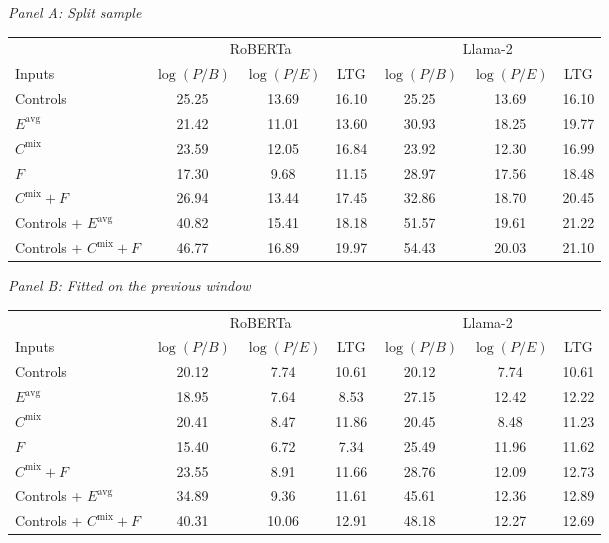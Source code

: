 \begin{table}[htbp]
{\footnotesize
\textit{Panel A: Split sample}\\[2pt]
\begin{adjustbox}{max width=\linewidth, max totalheight=0.28\textheight}
\begin{tabular}{lcccccc}
\toprule
 & \multicolumn{3}{c}{RoBERTa} & \multicolumn{3}{c}{Llama-2} \\
\cmidrule(lr){2-4} \cmidrule(lr){5-7}
Inputs & $\log(P/B)$ & $\log(P/E)$ & LTG & $\log(P/B)$ & $\log(P/E)$ & LTG \\
\midrule
Controls & 25.25 & 13.69 & 16.10 & 25.25 & 13.69 & 16.10 \\
$E^{\mathrm{avg}}$ & 21.42 & 11.01 & 13.60 & 30.93 & 18.25 & 19.77 \\
$C^{\mathrm{mix}}$ & 23.59 & 12.05 & 16.84 & 23.92 & 12.30 & 16.99 \\
$F$ & 17.30 & \phantom{0}9.68 & 11.15 & 28.97 & 17.56 & 18.48 \\
$C^{\mathrm{mix}}+F$ & 26.94 & 13.44 & 17.45 & 32.86 & 18.70 & 20.45 \\
Controls + $E^{\mathrm{avg}}$ & 40.82 & 15.41 & 18.18 & 51.57 & 19.61 & 21.22 \\
Controls + $C^{\mathrm{mix}}+F$ & 46.77 & 16.89 & 19.97 & 54.43 & 20.03 & 21.10 \\
\bottomrule
\end{tabular}
\end{adjustbox}
\par\medskip
\textit{Panel B: Fitted on the previous window}\\[2pt]
\begin{adjustbox}{max width=\linewidth, max totalheight=0.28\textheight}
\begin{tabular}{lcccccc}
\toprule
 & \multicolumn{3}{c}{RoBERTa} & \multicolumn{3}{c}{Llama-2} \\
\cmidrule(lr){2-4} \cmidrule(lr){5-7}
Inputs & $\log(P/B)$ & $\log(P/E)$ & LTG & $\log(P/B)$ & $\log(P/E)$ & LTG \\
\midrule
Controls & 20.12 & \phantom{0}7.74 & 10.61 & 20.12 & \phantom{0}7.74 & 10.61 \\
$E^{\mathrm{avg}}$ & 18.95 & \phantom{0}7.64 & \phantom{0}8.53 & 27.15 & 12.42 & 12.22 \\
$C^{\mathrm{mix}}$ & 20.41 & \phantom{0}8.47 & 11.86 & 20.45 & \phantom{0}8.48 & 11.23 \\
$F$ & 15.40 & \phantom{0}6.72 & \phantom{0}7.34 & 25.49 & 11.96 & 11.62 \\
$C^{\mathrm{mix}}+F$ & 23.55 & \phantom{0}8.91 & 11.66 & 28.76 & 12.09 & 12.73 \\
Controls + $E^{\mathrm{avg}}$ & 34.89 & \phantom{0}9.36 & 11.61 & 45.61 & 12.36 & 12.89 \\
Controls + $C^{\mathrm{mix}}+F$ & 40.31 & 10.06 & 12.91 & 48.18 & 12.27 & 12.69 \\
\bottomrule
\end{tabular}
\end{adjustbox}
}
\end{table}
